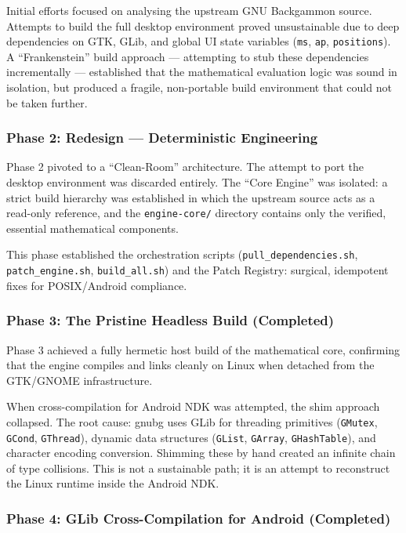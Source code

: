 \documentclass[11pt,a4paper]{article}
\begin{document}
Initial efforts focused on analysing the upstream GNU Backgammon source.
Attempts to build the full desktop environment proved unsustainable due
to deep dependencies on GTK, GLib, and global UI state variables
(\texttt{ms}, \texttt{ap}, \texttt{positions}). A ``Frankenstein'' build
approach --- attempting to stub these dependencies incrementally ---
established that the mathematical evaluation logic was sound in
isolation, but produced a fragile, non-portable build environment that
could not be taken further.

\subsubsection{Phase 2: Redesign --- Deterministic
Engineering}\label{phase-2-redesign-deterministic-engineering}

Phase 2 pivoted to a ``Clean-Room'' architecture. The attempt to port
the desktop environment was discarded entirely. The ``Core Engine'' was
isolated: a strict build hierarchy was established in which the upstream
source acts as a read-only reference, and the \texttt{engine-core/}
directory contains only the verified, essential mathematical components.

This phase established the orchestration scripts
(\texttt{pull\_dependencies.sh}, \texttt{patch\_engine.sh},
\texttt{build\_all.sh}) and the Patch Registry: surgical, idempotent
fixes for POSIX/Android compliance.

\subsubsection{Phase 3: The Pristine Headless Build
(Completed)}\label{phase-3-the-pristine-headless-build-completed}

Phase 3 achieved a fully hermetic host build of the mathematical core,
confirming that the engine compiles and links cleanly on Linux when
detached from the GTK/GNOME infrastructure.

When cross-compilation for Android NDK was attempted, the shim approach
collapsed. The root cause: gnubg uses GLib for threading primitives
(\texttt{GMutex}, \texttt{GCond}, \texttt{GThread}), dynamic data
structures (\texttt{GList}, \texttt{GArray}, \texttt{GHashTable}), and
character encoding conversion. Shimming these by hand created an
infinite chain of type collisions. This is not a sustainable path; it is
an attempt to reconstruct the Linux runtime inside the Android NDK.

\subsubsection{Phase 4: GLib Cross-Compilation for Android
(Completed)}\label{phase-4-glib-cross-compilation-for-android-completed}
\end{document}
